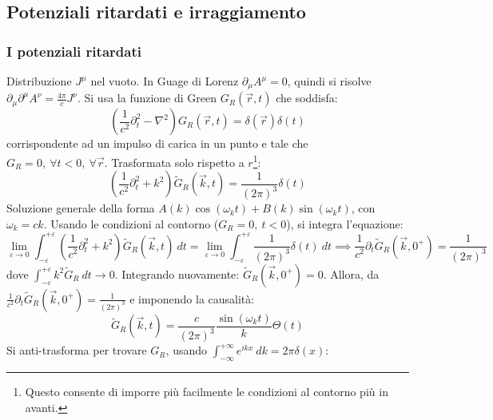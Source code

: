 \documentclass[10pt, a4paper]{scrartcl}
\numberwithin{equation}{subsection}
\theoremstyle{style1}
\begin{document}
\subsection{Potenziali ritardati e irraggiamento}

\subsubsection{I potenziali ritardati}

Distribuzione $J^\mu $ nel vuoto. In Guage di Lorenz $\partial _\mu A^\mu =0$, quindi si risolve $\partial _\mu \partial ^\mu A^\nu = \frac{4\pi}{c} J^\nu $. Si usa la funzione di Green $G_R(\vec{r},t)$ che soddisfa:
\begin{equation}
	\left(\frac{1}{c^2}\partial _t^2 - \nabla ^2\right) G_R(\vec{r},t) = \delta (\vec{r}) \delta (t)
\end{equation}
corrispondente ad un impulso di carica in un punto e tale che $G_R = 0, \ \forall t < 0, \ \forall \vec{r}$. Trasformata solo rispetto a $r$\footnote{Questo consente di imporre pi\`u facilmente le condizioni al contorno pi\`u in avanti.}:
\begin{equation}
	\left(\frac{1}{c^2}\partial _t^2 + k^2\right) \widetilde{G}_R(\vec{k},t) = \frac{1}{(2\pi)^3}\delta (t)
\end{equation}
Soluzione generale della forma $A(k) \cos(\omega_k t) + B(k) \sin(\omega_k t)$, con $\omega_k = ck$. Usando le condizioni al contorno ($G_R = 0, \ t <0$), si integra l'equazione:
\begin{equation*}
		\lim_{\varepsilon  \to 0} \int_{-\varepsilon } ^{+\varepsilon } \left(\frac{1}{c^2}\partial _t^2 + k^2\right) \widetilde{G}_R(\vec{k},t) \ dt = \lim_{\varepsilon  \to 0} \int_{-\varepsilon } ^{+\varepsilon } \frac{1}{(2\pi)^3}\delta (t)\ dt \implies \frac{1}{c^2}\partial _t \widetilde{G}_R (\vec{k},0^+)= \frac{1}{(2\pi)^3}
\end{equation*}
dove $\int_{-\varepsilon } ^{+\varepsilon } k^2 \widetilde{G}_R \ dt \to 0$. Integrando nuovamente: $\widetilde{G}_R(\vec{k},0^+)=0$. Allora, da $\frac{1}{c^2}\partial _t \widetilde{G}_R (\vec{k},0^+)= \frac{1}{(2\pi)^3}$ e imponendo la causalit\`a:
\begin{equation}
\widetilde{G}_R(\vec{k},t) = \frac{c}{(2\pi)^3} \frac{\sin (\omega_k t)}{k}\Theta(t)
\end{equation}
Si anti-trasforma per trovare $G_R$, usando $\int_{-\infty} ^{+\infty}  e^{ikx} \ dk = 2\pi \delta (x)$:
\end{document}
